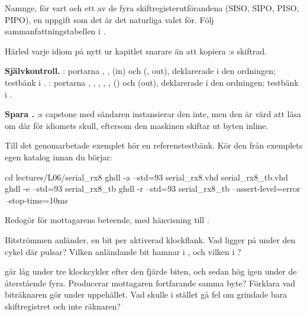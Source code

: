 
 Namnge, för vart och ett av de fyra skiftregisterutförandena (SISO, SIPO, PISO, PIPO), en
uppgift som det är det naturliga valet för. Följ sammanfattningstabellen i .

Härled varje idiom på nytt ur kapitlet snarare än att kopiera :s skiftrad.

\begin{selfcheck}
\textbf{Självkontroll.} : portarna , , 
(in) och  (, out), deklarerade i den
ordningen; testbänk i . : portarna ,
, , , , 
() och  (out), deklarerade i den ordningen;
testbänk i .

\textbf{Spara .} :s capstone med sändaren instansierar den inte, men den
är värd att läsa om där för idiomets skull, eftersom den maskinen skiftar ut byten inline.
\end{selfcheck}


Till det genomarbetade exemplet hör en referenstestbänk. Kör den från exemplets egen katalog innan
du börjar:

\begin{shell}
cd lectures/L06/serial_rx8
ghdl -a --std=93 serial_rx8.vhd serial_rx8_tb.vhd
ghdl -e --std=93 serial_rx8_tb
ghdl -r --std=93 serial_rx8_tb --assert-level=error --stop-time=10ms
\end{shell}

\label{c6:ex:rx8}
Redogör för mottagarens beteende, med hänvisning till .

 Bitströmmen  anländer, en bit per aktiverad klockflank. Vad
ligger på  under den cykel där  pulsar? Vilken anländande bit hamnar
i , och vilken i ?

  går låg under tre klockcykler efter den fjärde biten, och sedan hög
igen under de återstående fyra. Producerar mottagaren fortfarande samma byte? Förklara vad
biträknaren gör under uppehållet. Vad skulle i stället gå fel om  grindade bara
skiftregistret och inte räknaren?

